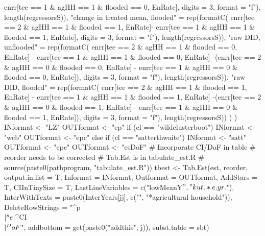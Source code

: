 \begin{Schunk}
\begin{Sinput}
{{{{{{{{                         enrr[tee == 1 & agHH == 1 & flooded == 0, EnRate], 
                         digits = 3, format = "f"), length(regressorsS)),
                     "change in treated mean, flooded" = 
                       rep(formatC(
                         enrr[tee == 2 & agHH == 1 & flooded == 1, EnRate]-
                         enrr[tee == 1 & agHH == 1 & flooded == 1, EnRate], 
                         digits = 3, format = "f"), length(regressorsS)),
                     "raw DID, unflooded" =
                       rep(formatC(
                       enrr[tee == 2 & agHH == 1 & flooded == 0, EnRate] - 
                       enrr[tee == 1 & agHH == 1 & flooded == 0, EnRate] 
                       -(enrr[tee == 2 & agHH == 0 & flooded == 0, EnRate] - 
                         enrr[tee == 1 & agHH == 0 & flooded == 0, EnRate]), 
                         digits = 3, format = "f"), length(regressorsS)),
                     "raw DID, flooded" =
                       rep(formatC(
                       enrr[tee == 2 & agHH == 1 & flooded == 1, EnRate] - 
                       enrr[tee == 1 & agHH == 1 & flooded == 1, EnRate] 
                       -(enrr[tee == 2 & agHH == 0 & flooded == 1, EnRate] - 
                         enrr[tee == 1 & agHH == 0 & flooded == 1, EnRate]), 
                         digits = 3, format = "f"), length(regressorsS))
                   )
                )
                INformat <- "LZ"
                OUTformat <- "ep"
                if (cl == "wildclusterboot") {
                  INformat <- "wcb"
                  OUTformat <- "epc"
                } else if (cl == "satterthwaite") {
                  INformat <- "satt"
                  OUTformat <- "epc"
                  OUTformat <- "esDoF"
                }
                # Incorporate CI/DoF in table
                # reorder needs to be corrected
                # Tab.Est is in tabulate_est.R
                # source(paste0(pathprogram, "tabulate_est.R"))
                tbest <- Tab.Est(est, reorder, output.in.list = T,
                  Informat = INformat, Outformat = OUTformat, 
                  AddStars = T, 
                  CIInTinySize = T, 
                  LastLineVariables = c("lowMeanY$", "kut.*e.yr.$"),
                  InterWithTexts = paste0(InterYears[jj], c("", "*agricultural household")),
                  DeleteRowStrings = "^p\\$|^se\\$|^CI\\$|^DoF\\$",
                  addbottom = get(paste0("addthis", j)), subst.table = sbt)
}}}}}}}}
\end{Sinput}
\end{Schunk}
